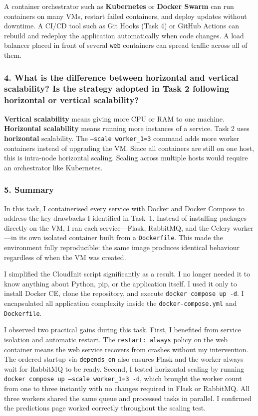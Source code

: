 \documentclass[11pt,a4paper]{article}
\begin{document}
A container orchestrator such as \textbf{Kubernetes} or \textbf{Docker Swarm} can
run containers on many VMs, restart failed containers, and deploy updates without
downtime. A CI/CD tool such as Git Hooks (Task 4) or GitHub Actions can rebuild and
redeploy the application automatically when code changes. A
load balancer placed in front of several \texttt{web} containers can spread traffic
across all of them.

\subsubsection*{4. What is the difference between horizontal and vertical scalability? Is the strategy
adopted in Task 2 following horizontal or vertical scalability?}

\textbf{Vertical scalability} means giving more CPU or RAM to one machine.
\textbf{Horizontal scalability} means running more instances of a service.
Task 2 uses \textbf{horizontal} scalability.
The \texttt{--scale worker\_1=3} command adds more worker containers instead of
upgrading the VM.
Since all containers are still on one host, this is intra-node horizontal scaling.
Scaling across multiple hosts would require an orchestrator like Kubernetes.

\subsubsection*{5. Summary}

In this task, I containerised every service with Docker and Docker Compose to
address the key drawbacks I identified in Task~1. Instead of installing packages
directly on the VM, I ran each service---Flask, RabbitMQ, and the Celery
worker---in its own isolated container built from a \texttt{Dockerfile}.
This made the environment fully reproducible: the same image produces identical
behaviour regardless of when the VM was created.

I simplified the CloudInit script significantly as a result. I no longer needed it
to know anything about Python, pip, or the application itself. I used it only to
install Docker CE, clone the repository, and execute \texttt{docker compose up -d}.
I encapsulated all application complexity inside the \texttt{docker-compose.yml}
and \texttt{Dockerfile}.

I observed two practical gains during this task. First, I benefited from service isolation and automatic restart. The
\texttt{restart: always} policy on the web container means the web service recovers
from crashes without my intervention. The ordered startup via \texttt{depends\_on}
also ensures Flask and the worker always wait for RabbitMQ to be ready. Second, I tested horizontal scaling by running
\texttt{docker compose up --scale worker\_1=3 -d}, which brought the worker count
from one to three instantly with no changes required in Flask or RabbitMQ. All
three workers shared the same queue and processed tasks in parallel. I confirmed
the predictions page worked correctly throughout the scaling test.
\end{document}
